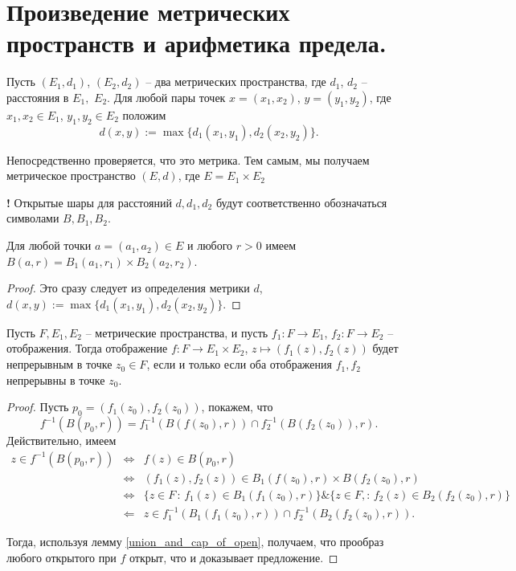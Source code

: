\section{Произведение метрических пространств и арифметика предела.}

\begin{definition}
 Пусть $(E_1,d_1)$, $(E_2,d_2)$ -- два метрических пространства, где $d_1$, $d_2$ -- расстояния в $E_1,$ $E_2$. Для любой пары точек $x = (x_1,x_2)$, $y = (y_1,y_2)$, где $x_1, x_2 \in E_1$, $y_1,y_2 \in E_2$ положим
 \[
  d(x,y):= \max \{ d_1(x_1,y_1), d_2(x_2,y_2)\}.
 \]
\end{definition}

Непосредственно проверяется, что это метрика. Тем самым, мы получаем метрическое пространство $(E, d)$, где $E = E_1 \times E_2$

\begin{mydanger}{\bf !}
    Открытые шары для расстояний $d,d_1,d_2$ будут соответственно обозначаться символами $B,B_1,B_2.$
\end{mydanger}

\begin{lemma}
    Для любой точки $a = (a_1,a_2) \in E$ и любого $r >0$ имеем $ B(a,r )  = B_1(a_1,r_1) \times B_2(a_2, r_2)$.
\end{lemma}
\begin{proof}
    Это сразу следует из определения метрики $d$, $d(x,y):= \max \{ d_1(x_1,y_1), d_2(x_2,y_2)\}.$
\end{proof}

\begin{proposition}\label{continous_of_times}
    Пусть $F,E_1,E_2$ -- метрические пространства, и пусть $f_1:F \to E_1$, $f_2:F \to E_2$ -- отображения. Тогда отображение $f:F \to E_1 \times E_2$, $z \mapsto (f_1(z), f_2(z))$ будет непрерывным в точке $z_0 \in F$, если и только если оба отображения $f_1,f_2$ непрерывны в точке $z_0.$
\end{proposition}
\begin{proof}
    Пусть $p_0 = (f_1(z_0), f_2(z_0))$, покажем, что 
    \[
     f^{-1} (B(p_0, r)) = f_1^{-1}(B(f(z_0) , r)) \cap f_2^{-1}( B(f_2(z_0)), r ).
    \]
Действительно, имеем
\begin{eqnarray*}
  z \in f^{-1} (B(p_0, r)) &\Longleftrightarrow&  f(z) \in B(p_0,r) \\
   &\Longleftrightarrow& (f_1(z), f_2(z)) \in B_1(f(z_0), r) \times B(f_2(z_0), r) \\
   &\Longleftrightarrow& \bigl\{ z \in F\,:\, f_1(z) \in B_1(f_1(z_0), r) \bigr\}  \& \bigl\{ z\in F, :\, f_2(z) \in B_2(f_2(z_0), r) \bigr\} \\
   &\Longleftarrow& z \in f_1^{-1}(B_1(f_1(z_0), r)) \cap f_2^{-1}(B_2(f_2(z_0), r)).
\end{eqnarray*}

Тогда, используя лемму \ref{union_and_cap_of_open}, получаем, что прообраз любого открытого при $f$ открыт, что и доказывает предложение.
\end{proof}

